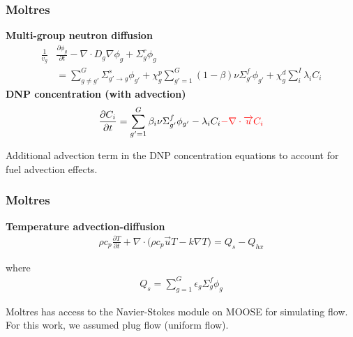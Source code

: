 \begin{frame}
	\frametitle{Moltres}
	\textbf{Multi-group neutron diffusion}
		\begin{align}
	\frac{1}{v_g} &\frac{\partial \phi_g}{\partial t} - \nabla \cdot D_g \nabla
	\phi_g + \Sigma^r_g \phi_g \nonumber \\ 
	&= \sum^G_{g \neq g'} \Sigma^s_{g' \rightarrow g} \phi_{g'} + \chi^p_g
	\sum^G_{g'=1} (1-\beta) \nu \Sigma^f_{g'} \phi_{g'} + \chi^d_g \sum^I_i
	\lambda_i C_i \label{eq1}
		\end{align}
	\textbf{\gls{DNP} concentration (with advection)}
		\begin{align}
	\frac{\partial C_i}{\partial t} = \sum^G_{g'=1} \beta_i \nu \Sigma^f_{g'}
	\phi_{g'} - \lambda_i C_i
	{\color{red}
	 - \nabla \cdot \overrightarrow{u} C_i}
	\label{eq2}
		\end{align}
		
		Additional advection term in the \gls{DNP} concentration
		equations to account for fuel advection effects.
\end{frame}

\begin{frame}
	\frametitle{Moltres}
		\textbf{Temperature advection-diffusion}
		\begin{align}
	\rho c_{p} \frac{\partial T}{\partial t} + \nabla \cdot \big( \rho
	c_{p} \overrightarrow{u} T - k \nabla T \big) = Q_s - Q_{hx}
	\label{eq3}
		\end{align}
		
		where
		\begin{align*}
		Q_s = \sum^G_{g=1} \epsilon_g \Sigma_g^f \phi_g \label{eq4}
		\end{align*}
		
		Moltres has access to the Navier-Stokes module on \gls{MOOSE} for
		simulating flow. For this work, we assumed plug flow (uniform flow).
\end{frame}

